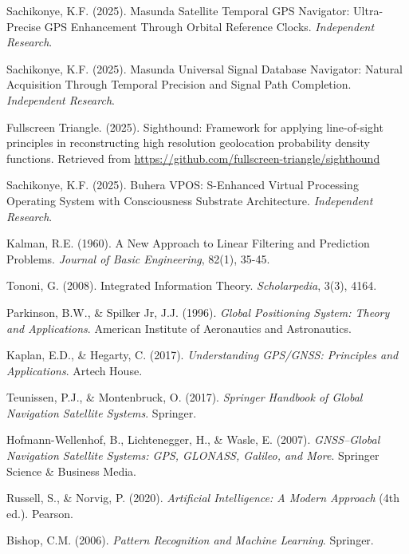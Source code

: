 \documentclass[12pt,a4paper]{article}
\begin{document}

\begin{thebibliography}{99}

Sachikonye, K.F. (2025). Masunda Satellite Temporal GPS Navigator: Ultra-Precise GPS Enhancement Through Orbital Reference Clocks. \textit{Independent Research}.

Sachikonye, K.F. (2025). Masunda Universal Signal Database Navigator: Natural Acquisition Through Temporal Precision and Signal Path Completion. \textit{Independent Research}.

Fullscreen Triangle. (2025). Sighthound: Framework for applying line-of-sight principles in reconstructing high resolution geolocation probability density functions. Retrieved from \url{https://github.com/fullscreen-triangle/sighthound}

Sachikonye, K.F. (2025). Buhera VPOS: S-Enhanced Virtual Processing Operating System with Consciousness Substrate Architecture. \textit{Independent Research}.

Kalman, R.E. (1960). A New Approach to Linear Filtering and Prediction Problems. \textit{Journal of Basic Engineering}, 82(1), 35-45.

Tononi, G. (2008). Integrated Information Theory. \textit{Scholarpedia}, 3(3), 4164.

Parkinson, B.W., \& Spilker Jr, J.J. (1996). \textit{Global Positioning System: Theory and Applications}. American Institute of Aeronautics and Astronautics.

Kaplan, E.D., \& Hegarty, C. (2017). \textit{Understanding GPS/GNSS: Principles and Applications}. Artech House.

Teunissen, P.J., \& Montenbruck, O. (2017). \textit{Springer Handbook of Global Navigation Satellite Systems}. Springer.

Hofmann-Wellenhof, B., Lichtenegger, H., \& Wasle, E. (2007). \textit{GNSS–Global Navigation Satellite Systems: GPS, GLONASS, Galileo, and More}. Springer Science \& Business Media.

Russell, S., \& Norvig, P. (2020). \textit{Artificial Intelligence: A Modern Approach} (4th ed.). Pearson.

Bishop, C.M. (2006). \textit{Pattern Recognition and Machine Learning}. Springer.


\end{thebibliography}
\end{document}
